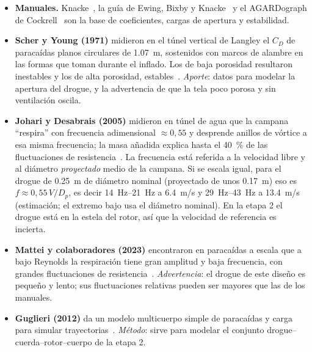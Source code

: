 \begin{itemize}
  \item \textbf{Manuales.} Knacke~\cite{knacke1992}, la guía de Ewing, Bixby y
        Knacke~\cite{literatura-ewing1978} y el AGARDograph de
        Cockrell~\cite{literatura-cockrell1987} son la base de coeficientes, cargas de
        apertura y estabilidad.
  \item \textbf{Scher y Young (1971)} midieron en el túnel vertical de Langley el
        $C_D$ de paracaídas planos circulares de \SI{1.07}{m}, sostenidos con marcos de
        alambre en las formas que toman durante el inflado. Los de baja porosidad
        resultaron inestables y los de alta porosidad,
        estables~\cite{literatura-scher1971}. \emph{Aporte}: datos para modelar la
        apertura del drogue, y la advertencia de que la tela poco porosa y sin
        ventilación oscila.
  \item \textbf{Johari y Desabrais (2005)} midieron en túnel de agua que la campana
        ``respira'' con frecuencia adimensional $\approx0{,}55$ y desprende anillos de
        vórtice a esa misma frecuencia; la masa añadida explica hasta el
        \SI{40}{\percent} de las fluctuaciones de resistencia~\cite{literatura-johari2005}.
        La frecuencia está referida a la velocidad libre y al diámetro
        \emph{proyectado} medio de la campana. Si se escala igual, para el drogue de
        \SI{0.25}{m} de diámetro nominal (proyectado de unos \SI{0.17}{m}) eso es
        $f\approx0{,}55\,V/D_p$, es decir \SIrange{14}{21}{Hz} a \SI{6.4}{m/s} y
        \SIrange{29}{43}{Hz} a \SI{13.4}{m/s} (estimación; el extremo bajo usa el
        diámetro nominal). En la etapa 2 el drogue está en la estela del rotor, así que
        la velocidad de referencia es incierta.
  \item \textbf{Mattei y colaboradores (2023)} encontraron en paracaídas a escala que a
        bajo Reynolds la respiración tiene gran amplitud y baja frecuencia, con grandes
        fluctuaciones de resistencia~\cite{literatura-mattei2023}. \emph{Advertencia}: el
        drogue de este diseño es pequeño y lento; sus fluctuaciones relativas pueden ser
        mayores que las de los manuales.
  \item \textbf{Guglieri (2012)} da un modelo multicuerpo simple de paracaídas y carga
        para simular trayectorias~\cite{literatura-guglieri2012}. \emph{Método}: sirve
        para modelar el conjunto drogue--cuerda--rotor--cuerpo de la etapa 2.
\end{itemize}

